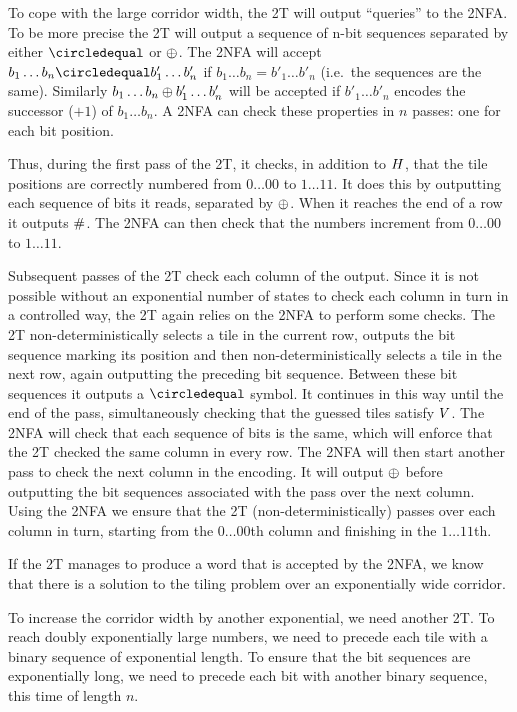 To cope with the large corridor width, the 2T will output ``queries'' to the 2NFA.
To be more precise the 2T will output a sequence of n-bit sequences separated by either
$\numeq$ or $\oplus$.
The 2NFA will accept
$b_1 \ldots b_n \numeq b'_1 \ldots b'_n$
if
$b_1 \ldots b_n = b'_1 \ldots b'_n$
(i.e.~the sequences are the same).
Similarly
$b_1 \ldots b_n \oplus b'_1 \ldots b'_n$
will be accepted if 
$b'_1 \ldots b'_n$
encodes the successor ($+1$) of
$b_1 \ldots b_n$.
A 2NFA can check these properties in $n$ passes: one for each bit position.

Thus, during the first pass of the 2T, it checks, in addition to $H$, that the tile positions are correctly numbered from $0\ldots00$ to $1\ldots11$.
It does this by outputting each sequence of bits it reads, separated by $\oplus$.
When it reaches the end of a row it outputs $\#$.
The 2NFA can then check that the numbers increment from $0\ldots00$ to $1\ldots11$.

Subsequent passes of the 2T check each column of the output.
Since it is not possible without an exponential number of states to check each column in turn in a controlled way, the 2T again relies on the 2NFA to perform some checks.
The 2T non-deterministically selects a tile in the current row, outputs the bit sequence marking its position and then non-deterministically selects a tile in the next row, again outputting the preceding bit sequence.
Between these bit sequences it outputs a $\numeq$ symbol.
It continues in this way until the end of the pass, simultaneously checking that the guessed tiles satisfy $V$.
The 2NFA will check that each sequence of bits is the same, which will enforce that the 2T checked the same column in every row.
The 2NFA will then start another pass to check the next column in the encoding.
It will output $\oplus$ before outputting the bit sequences associated with the pass over the next column.
Using the 2NFA we ensure that the 2T (non-deterministically) passes over each column in turn, starting from the $0\ldots00$th column and finishing in the $1\ldots11$th.

If the 2T manages to produce a word that is accepted by the 2NFA, we know that there is a solution to the tiling problem over an exponentially wide corridor.

To increase the corridor width by another exponential, we need another 2T.
To reach doubly exponentially large numbers, we need to precede each tile with a binary sequence of exponential length.
To ensure that the bit sequences are exponentially long, we need to precede each bit with another binary sequence, this time of length $n$. 

